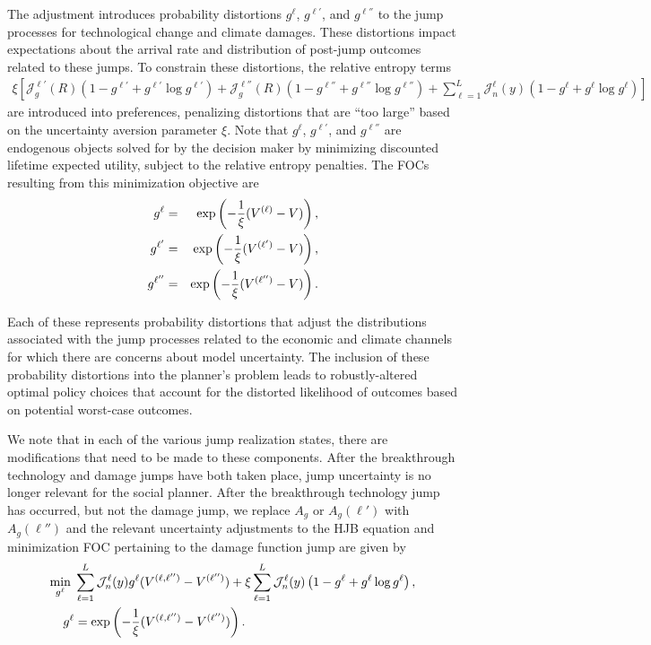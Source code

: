 \documentclass[12pt]{article}
\begin{document}
\begin{appendices}
The adjustment introduces probability distortions $g^{\ell}$, $g^{\ell'}$, and $g^{\ell''}$ to the jump processes for technological change and climate damages. These distortions impact expectations about the arrival rate and distribution of post-jump outcomes related to these jumps. To constrain these distortions, the relative entropy terms 
\begin{eqnarray*}
 \xi \left[ \mathcal{J}^{\ell'}_g(R) \left( 1 - g^{\ell'} + g^{\ell'} \log g^{\ell'} \right)  + \mathcal{J}^{\ell''}_g(R) \left( 1 - g^{\ell''} + g^{\ell''} \log g^{\ell''} \right)  +\sum_{\ell=1}^{L} \mathcal{J}^{\ell}_n(y) \left( 1 - g^{\ell} + g^{\ell} \log g^{\ell} \right) \right]
\end{eqnarray*} 
are introduced into preferences, penalizing distortions that are ``too large'' based on the uncertainty aversion parameter $\xi$. Note that $g^{\ell}$, $g^{\ell'}$, and $g^{\ell''}$ are endogenous objects solved for by the decision maker by minimizing discounted lifetime expected utility, subject to the relative entropy penalties. The FOCs resulting from this minimization objective are 
\begin{eqnarray*}
g^{\ell} & = & \exp \left(- \frac{1}{\xi} (V^{(\ell)}-V) \right), \cr
g^{\ell'} & = & \exp \left( -\frac{1}{\xi} (V^{(\ell')} - V) \right), \cr
g^{\ell''} & = & \exp \left( -\frac{1}{\xi} (V^{(\ell'')} - V) \right).  
\end{eqnarray*} 


Each of these represents probability distortions that adjust the distributions associated with the jump processes related to the economic and climate channels for which there are concerns about model uncertainty. The inclusion of these probability distortions into the planner's problem leads to robustly-altered optimal policy choices that account for the distorted likelihood of outcomes based on potential worst-case outcomes. 

We note that in each of the various jump realization states, there are modifications that need to be made to these components. After the breakthrough technology and damage jumps have both taken place, jump uncertainty is no longer relevant for the social planner. After the breakthrough technology jump has occurred, but not the damage jump, we replace $A_g$ or $A_g(\ell')$ with $A_g(\ell'')$ and the relevant uncertainty adjustments to the HJB equation and minimization FOC pertaining to the damage function jump are given by
\begin{equation*}
\begin{split}
\min_{g^{\ell}} \hspace{0.1cm} &  \sum_{\ell=1}^{L} \mathcal{J}^{\ell}_n(y) g^{\ell} (V^{(\ell,\ell'')} - V^{(\ell'')}) + \xi \sum_{\ell=1}^{L} \mathcal{J}^{\ell}_n(y) \left( 1 - g^{\ell} + g^{\ell} \log g^{\ell} \right), \\
g^{\ell} & =  \exp \left( -\frac{1}{\xi} (V^{(\ell,\ell'')} - V^{(\ell'')}) \right). \cr
\end{split}
\end{equation*}


\end{appendices}
\end{document}
